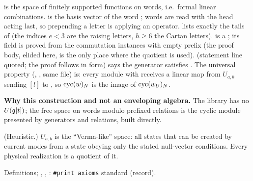 \begin{dictionary}
 is the space of finitely supported functions on words, i.e.\ formal linear combinations.
 is the basis vector of the word ; words are read with the head acting last, so prepending a letter is
applying an operator.  lists exactly the tails of  (the indices $e<3$ are the raising
letters, $h\ge6$ the Cartan letters).  is a ; its  field is proved from the
commutation instances with empty prefix (the proof body, elided here, is the only place where the quotient is used).
 (statement line quoted; the proof follows in  form) says the generator satisfies
. The universal property (, , same file) is: every module with
 receives a linear map from $U_{a,b}$ sending $[l]$ to , so
$\operatorname{cyc}(w)_N$ is the image of $\operatorname{cyc}(w_U)_N$.

\textbf{Why this construction and not an enveloping algebra.} The library has no $U(\mathfrak g[t])$; the free space on
words modulo prefixed relations is the cyclic module presented by generators and relations, built directly.
\end{dictionary}

\begin{physics}
(Heuristic.) $U_{a,b}$ is the ``Verma-like'' space: all states that can be created by current modes from a state obeying only the
stated null-vector conditions. Every physical realization is a quotient of it.
\end{physics}

\begin{status}
Definitions; , , : \texttt{\#print axioms} standard (record).
\end{status}

